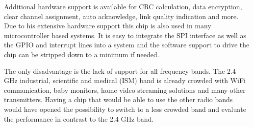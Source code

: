 Additional hardware support is available for CRC calculation, data encryption, clear
channel assignment, auto acknowledge, link quality indication and more. Due to
his extensive hardware support this chip is also used in many microcontroller
based systems. It is easy to integrate the SPI interface as well as the GPIO and
interrupt lines into a system and the software support to drive the chip can be
stripped down to a minimum if needed.

The only disadvantage is the lack of support for all frequency bands. The 2.4 GHz
industrial, scientific and medical (ISM) band is already crowded with WiFi
communication, baby monitors, home video streaming solutions and many other
transmitters. Having a chip that would be able to use the other radio bands
would have opened the possibility to switch to a less crowded band and evaluate
the performance in contrast to the 2.4 GHz band.

